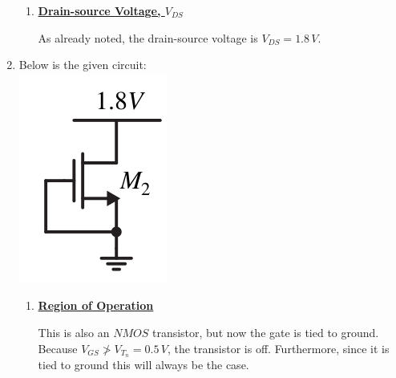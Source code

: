 \documentclass[12pt, fleqn]{article}
\begin{document}
\begin{enumerate}[label=(\alph*)]
{\begin{enumerate}[label=(\roman*)]
{        \vspace{0.15cm}
        Because this is a saturated $NMOS$, we will use \textit{Eq.~\ref{eq:mosfet_ids_nmos_sat}} to solve for the drain current:
        \begin{align*}
            I_{DS,sat} &= \left(\frac{W}{2L}\right) \mu_n\,C_{ox}
                             {\big(V_{GS} - V_{T_n}\big)}^2 (1 + \cancelto{0}{\lambda V_{DS}})\\[0.25cm]
            &= \left(\frac{10\,\cancel{\mu m}}{2 \cdot 0.5\,\cancel{\mu m}}\right) 200\,\mu A/V^2{\big(1.3\,V\big)}^2\\[0.25cm]
            &= 10 \cdot 200\,\mu A/\cancel{V^2} \cdot 1.69\,\cancel{V^2}\\[0.25cm]
            &= 3380\,\mu A\\[0.25cm]
            \Aboxed{&= 3.38\,mA}
        \end{align*}
        }
        \item
        {
        \underline{\textbf{Drain-source Voltage, $V_{DS}$}}
        
        \vspace{0.15cm}
        As already noted, the drain-source voltage is $\boxed{V_{DS} = 1.8\,V}$.
        }
    \end{enumerate}
    }
    \newpage\noindent
    \item
    {
    Below is the given circuit:\\
    \includegraphics[scale=0.55, center]{p1b.png}\\
    \begin{enumerate}[label=(\roman*)]
        \item
        {
        \underline{\textbf{Region of Operation}}
        
        \vspace{0.15cm}
        This is also an $NMOS$ transistor, but now the gate is tied to ground. Because $V_{GS} \not > V_{T_n} = 0.5\,V$, the transistor is off.  Furthermore, since it is tied to ground this will always be the case.
        
}
\end{enumerate}}
\end{enumerate}
\end{document}
